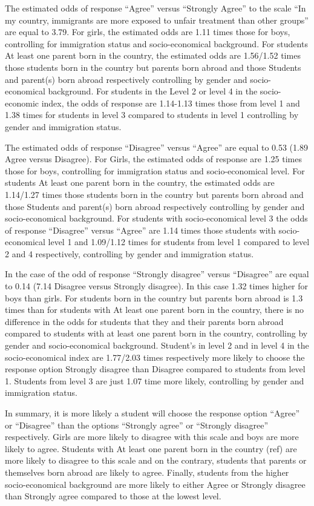 \documentclass[
  12pt,
]{article}
\begin{document}
The estimated odds of response ``Agree'' versus ``Strongly Agree'' to the scale ``In my country, immigrants are more exposed to unfair treatment than other groups'' are equal to 3.79. For girls, the estimated odds are 1.11 times those for boys, controlling for immigration status and socio-economical background. For students At least one parent born in the country, the estimated odds are 1.56/1.52 times those students born in the country but parents born abroad and those Students and parent(s) born abroad respectively controlling by gender and socio-economical background. For students in the Level 2 or level 4 in the socio-economic index, the odds of response are 1.14-1.13 times those from level 1 and 1.38 times for students in level 3 compared to students in level 1 controlling by gender and immigration status.

The estimated odds of response ``Disagree'' versus ``Agree'' are equal to 0.53 (1.89 Agree versus Disagree). For Girls, the estimated odds of response are 1.25 times those for boys, controlling for immigration status and socio-economical level. For students At least one parent born in the country, the estimated odds are 1.14/1.27 times those students born in the country but parents born abroad and those Students and parent(s) born abroad respectively controlling by gender and socio-economical background. For students with socio-economical level 3 the odds of response ``Disagree'' versus ``Agree'' are 1.14 times those students with socio-economical level 1 and 1.09/1.12 times for students from level 1 compared to level 2 and 4 respectively, controlling by gender and immigration status.

In the case of the odd of response ``Strongly disagree'' versus ``Disagree'' are equal to 0.14 (7.14 Disagree versus Strongly disagree). In this case 1.32 times higher for boys than girls. For students born in the country but parents born abroad is 1.3 times than for students with At least one parent born in the country, there is no difference in the odds for students that they and their parents born abroad compared to students with at least one parent born in the country, controlling by gender and socio-economical background. Student's in level 2 and in level 4 in the socio-economical index are 1.77/2.03 times respectively more likely to choose the response option Strongly disagree than Disagree compared to students from level 1. Students from level 3 are just 1.07 time more likely, controlling by gender and immigration status.

In summary, it is more likely a student will choose the response option ``Agree'' or ``Disagree'' than the options ``Strongly agree'' or ``Strongly disagree'' respectively. Girls are more likely to disagree with this scale and boys are more likely to agree. Students with At least one parent born in the country (ref) are more likely to disagree to this scale and on the contrary, students that parents or themselves born abroad are likely to agree. Finally, students from the higher socio-economical background are more likely to either Agree or Strongly disagree than Strongly agree compared to those at the lowest level.
\end{document}

